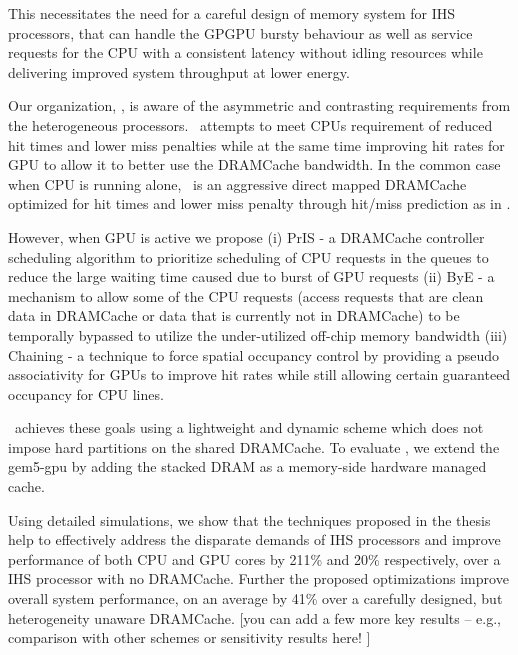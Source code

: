 This necessitates the need for a careful design of memory system for IHS processors, that can handle the GPGPU bursty behaviour as well as service requests for the CPU with a consistent latency without idling resources while delivering improved system throughput at lower energy.
\par Our organization, \cachename, is aware of the asymmetric and contrasting requirements from the heterogeneous processors. \cachename\ attempts to meet CPUs requirement of reduced hit times and lower miss penalties while at the same time improving hit rates for GPU to allow it to better use the DRAMCache bandwidth. In the common case when CPU is running alone, \cachename\ is an aggressive direct mapped DRAMCache optimized for hit times and lower miss penalty through hit/miss prediction as in \cite{alloy}. 

\par However, when GPU is active we propose (i) PrIS - a DRAMCache controller scheduling algorithm to prioritize scheduling of CPU requests in the queues to reduce the large waiting time caused due to burst of GPU requests (ii) ByE - a mechanism to allow some of the CPU requests (access requests that are clean data in DRAMCache or data that is currently not in DRAMCache) to be temporally bypassed to utilize the under-utilized off-chip memory bandwidth (iii) Chaining - a technique to force spatial occupancy control by providing a pseudo associativity for GPUs to improve hit rates while still allowing certain guaranteed occupancy for CPU lines.

\cachename\ achieves these goals using a lightweight and dynamic scheme which does not impose hard partitions on the shared DRAMCache. To evaluate
\cachename, we extend the gem5-gpu \cite{gem5-gpu} by adding the stacked DRAM as a memory-side hardware managed cache.

Using detailed simulations, we show that the techniques proposed in the thesis  help to effectively address the disparate demands of IHS
processors and improve performance of both CPU and GPU cores by 211\% and 20\% respectively, over a IHS processor with no DRAMCache.  Further the proposed optimizations improve overall system performance, on an average by 41\% over a carefully designed, but heterogeneity unaware DRAMCache.  
[you can add a few more key results -- e.g., comparison with other schemes
or sensitivity results here! ]

